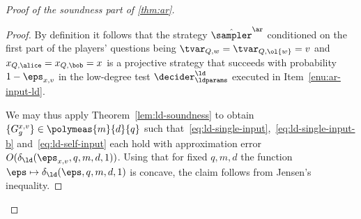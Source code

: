 \begin{proof}[Proof of the soundness part of \cref{thm:ar}]
\begin{proof}
    By definition it follows that the strategy $\tsans$ conditioned on the
    first part of the players' questions being $\tvar_{Q,w} = \tvar_{Q,\ol{w}} =
    v$ and $x_{Q,\alice}=x_{Q,\bob}=x$ is a projective strategy that succeeds
    with probability $1-\eps_{x,v}$ in the low-degree test
    $\decider^\ld_\ldparams$ executed in Item~\ref{enu:ar-input-ld}.
	
    We may thus apply Theorem~\ref{lem:ld-soundness} to obtain $\{G^{{x},v}_{g}\}
    \in \polymeas{m}{d}{q}$ such
    that~\eqref{eq:ld-single-input},~\eqref{eq:ld-single-input-b}
    and~\eqref{eq:ld-self-input} each hold with approximation error
    $O(\delta_{\ld}(\eps_{x,v},q,m,d,1))$.
    Using that for fixed $q,m,d$ the function
    $\eps\mapsto\delta_{\ld}(\eps,q,m,d,1)$ is concave, the claim follows from
    Jensen's inequality.
  \end{proof}


\end{proof}
